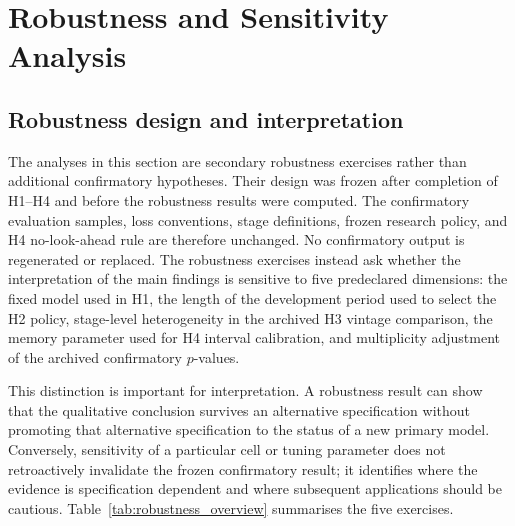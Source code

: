 \section{Robustness and Sensitivity Analysis}
\label{sec:robustness}

\subsection{Robustness design and interpretation}
\label{subsec:robustness_design}

The analyses in this section are secondary robustness exercises rather than
additional confirmatory hypotheses. Their design was frozen after completion
of H1--H4 and before the robustness results were computed. The confirmatory
evaluation samples, loss conventions, stage definitions, frozen research
policy, and H4 no-look-ahead rule are therefore unchanged. No confirmatory
output is regenerated or replaced. The robustness exercises instead ask
whether the interpretation of the main findings is sensitive to five
predeclared dimensions: the fixed model used in H1, the length of the
development period used to select the H2 policy, stage-level heterogeneity in
the archived H3 vintage comparison, the memory parameter used for H4 interval
calibration, and multiplicity adjustment of the archived confirmatory
\(p\)-values.

This distinction is important for interpretation. A robustness result can
show that the qualitative conclusion survives an alternative specification
without promoting that alternative specification to the status of a new
primary model. Conversely, sensitivity of a particular cell or tuning
parameter does not retroactively invalidate the frozen confirmatory result; it
identifies where the evidence is specification dependent and where subsequent
applications should be cautious. Table~\ref{tab:robustness_overview}
summarises the five exercises.

